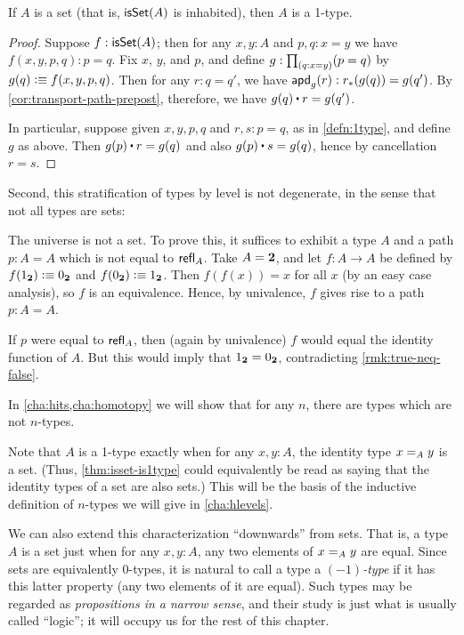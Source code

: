 \begin{lem}\label{thm:isset-is1type}
  If $A$ is a set (that is, $\isset(A)$ is inhabited), then $A$ is a 1-type.
\end{lem}
\begin{proof}
  Suppose $f:\isset(A)$; then for any $x,y:A$ and $p,q:x=y$ we have $f(x,y,p,q):p=q$.
  Fix $x$, $y$, and $p$, and define $g: \prd{q:x=y} (p=q)$ by $g(q) \defeq f (x,y,p,q)$.
  Then for any $r:q=q'$, we have $\apdfunc{g}(r) : \trans{r}{g(q)} = g(q')$.
  By \autoref{cor:transport-path-prepost}, therefore, we have $g(q) \ct r = g(q')$.

  In particular, suppose given $x,y,p,q$ and $r,s:p=q$, as in \autoref{defn:1type}, and define $g$ as above.
  Then $g(p) \ct r = g(q)$ and also $g(p) \ct s = g(q)$, hence by cancellation $r=s$.
\end{proof}

Second, this stratification of types by level is not degenerate, in the
sense that not all types are sets:  

\begin{eg}\label{thm:type-is-not-a-set}
  The universe \type is not a set.
  To prove this, it suffices to exhibit a type $A$ and a path $p:A=A$ which is not equal to $\refl A$.
  Take $A=\bool$, and let $f:A\to A$ be defined by $f(\btrue)\defeq \bfalse$ and $f(\bfalse)\defeq \btrue$.
  Then $f(f(x))=x$ for all $x$ (by an easy case analysis), so $f$ is an equivalence.
  Hence, by univalence, $f$ gives rise to a path $p:A=A$.

  If $p$ were equal to $\refl A$, then (again by univalence) $f$ would equal the identity function of $A$.
  But this would imply that $\btrue=\bfalse$, contradicting \autoref{rmk:true-neq-false}.
\end{eg}

In \autoref{cha:hits,cha:homotopy} we will show that for any $n$, there are types which are not $n$-types.

Note that $A$ is a 1-type exactly when for any $x,y:A$, the identity type $\id[A]xy$ is a set.
(Thus, \autoref{thm:isset-is1type} could equivalently be read as saying that the identity types of a set are also sets.)
This will be the basis of the inductive definition of $n$-types we will give in \autoref{cha:hlevels}.

We can also extend this characterization ``downwards'' from sets.
That is, a type $A$ is a set just when for any $x,y:A$, any two elements of $\id[A]xy$ are equal.
Since sets are equivalently 0-types, it is natural to call a type a \emph{$(-1)$-type} if it has this latter property (any two elements of it are equal).
Such types may be regarded as \emph{propositions in a narrow sense}, and their study is just what is usually called ``logic''; it will occupy us for the rest of this chapter.


